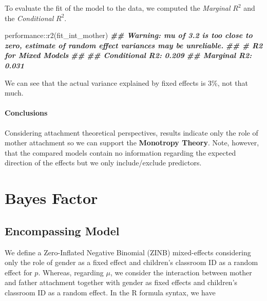 \documentclass[
]{book}
\newenvironment{Shaded}{\begin{snugshade}}{\end{snugshade}}
\newcommand{\DocumentationTok}[1]{\textcolor[rgb]{0.56,0.35,0.01}{\textbf{\textit{#1}}}}
\newcommand{\FunctionTok}[1]{\textcolor[rgb]{0.00,0.00,0.00}{#1}}
\newcommand{\NormalTok}[1]{#1}
\newcommand{\SpecialCharTok}[1]{\textcolor[rgb]{0.00,0.00,0.00}{#1}}
\begin{document}
To evaluate the fit of the model to the data, we computed the \emph{Marginal} \(R^2\) and the \emph{Conditional} \(R^2\).

\begin{Shaded}
\begin{Highlighting}[]
\NormalTok{performance}\SpecialCharTok{::}\FunctionTok{r2}\NormalTok{(fit\_int\_mother)}
\DocumentationTok{\#\# Warning: mu of 3.2 is too close to zero, estimate of random effect variances may be unreliable.}
\DocumentationTok{\#\# \# R2 for Mixed Models}
\DocumentationTok{\#\# }
\DocumentationTok{\#\#   Conditional R2: 0.209}
\DocumentationTok{\#\#      Marginal R2: 0.031}
\end{Highlighting}
\end{Shaded}

We can see that the actual variance explained by fixed effects is 3\%, not that much.

\hypertarget{conclusions-4}{%
\subsubsection*{Conclusions}\label{conclusions-4}}

Considering attachment theoretical perspectives, results indicate only the role of mother attachment so we can support the \textbf{Monotropy Theory}. Note, however, that the compared models contain no information regarding the expected direction of the effects but we only include/exclude predictors.

\hypertarget{BF-int}{%
\chapter{Bayes Factor}\label{BF-int}}

\hypertarget{encompassing-model-1}{%
\section{Encompassing Model}\label{encompassing-model-1}}

We define a Zero-Inflated Negative Binomial (ZINB) mixed-effects considering only the role of gender as a fixed effect and children's classroom ID as a random effect for \(p\). Whereas, regarding \(\mu\), we consider the interaction between mother and father attachment together with gender as fixed effects and children's classroom ID as a random effect. In the R formula syntax, we have
\end{document}
